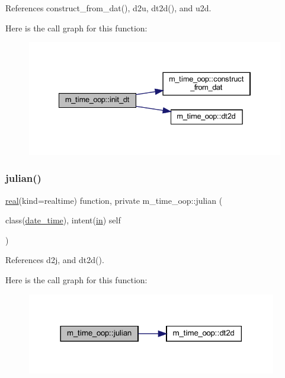 References construct\+\_\+from\+\_\+dat(), d2u, dt2d(), and u2d.

Here is the call graph for this function\+:
\nopagebreak
\begin{figure}[H]
\begin{center}
\leavevmode
\includegraphics[width=334pt]{namespacem__time__oop_ac81ff1eb27f637a60530d3c5d442fc71_cgraph}
\end{center}
\end{figure}
\mbox{\label{namespacem__time__oop_ae7610f40e1528f79016de9ebbb3a3fd1}} 
\subsubsection{\texorpdfstring{julian()}{julian()}}
{\footnotesize\ttfamily \hyperlink{read__watch_83_8txt_abdb62bde002f38ef75f810d3a905a823}{real}(kind=realtime) function, private m\+\_\+time\+\_\+oop\+::julian (\begin{DoxyParamCaption}\item[{class(\hyperlink{structm__time__oop_1_1date__time}{date\+\_\+time}), intent(\hyperlink{M__journal_83_8txt_afce72651d1eed785a2132bee863b2f38}{in})}]{self }\end{DoxyParamCaption})\hspace{0.3cm}{\ttfamily [private]}}



References d2j, and dt2d().

Here is the call graph for this function\+:
\nopagebreak
\begin{figure}[H]
\begin{center}
\leavevmode
\includegraphics[width=309pt]{namespacem__time__oop_ae7610f40e1528f79016de9ebbb3a3fd1_cgraph}
\end{center}
\end{figure}
\mbox{\label{namespacem__time__oop_a5e04ff772ac6d72f68031ec43c1e6c84}} 
